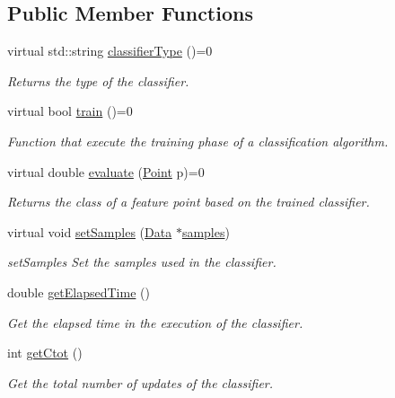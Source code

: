 \subsection*{Public Member Functions}
\begin{DoxyCompactItemize}
\item 
virtual std\+::string \hyperlink{class_classifier_a7bfe7cc88b851b4a7e7ec55b30dd844e}{classifier\+Type} ()=0
\begin{DoxyCompactList}\small\item\em Returns the type of the classifier. \end{DoxyCompactList}\item 
virtual bool \hyperlink{class_classifier_a2306a5de27555ab093593ac9642bc7d9}{train} ()=0
\begin{DoxyCompactList}\small\item\em Function that execute the training phase of a classification algorithm. \end{DoxyCompactList}\item 
virtual double \hyperlink{class_classifier_ae8e9554823b85ddc2dcad2955da811d9}{evaluate} (\hyperlink{class_point}{Point} p)=0
\begin{DoxyCompactList}\small\item\em Returns the class of a feature point based on the trained classifier. \end{DoxyCompactList}\item 
virtual void \hyperlink{class_classifier_a4b16736670cba8f4c8397b6a90c8c799}{set\+Samples} (\hyperlink{class_data}{Data} $\ast$\hyperlink{class_classifier_a515c225d0da93df02ca79f9f87811d17}{samples})
\begin{DoxyCompactList}\small\item\em set\+Samples Set the samples used in the classifier. \end{DoxyCompactList}\item 
double \hyperlink{class_classifier_ab47b67b061041193aa3ae2a7856f4980}{get\+Elapsed\+Time} ()
\begin{DoxyCompactList}\small\item\em Get the elapsed time in the execution of the classifier. \end{DoxyCompactList}\item 
int \hyperlink{class_classifier_ab80a78cd6a4efc59b16f5b80cd64dc63}{get\+Ctot} ()
\begin{DoxyCompactList}\small\item\em Get the total number of updates of the classifier. \end{DoxyCompactList}\item 

\end{DoxyCompactItemize}
